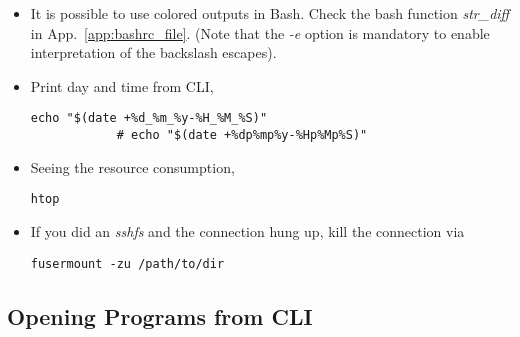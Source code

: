 \documentclass[12pt, a4paper]{article}
\numberwithin{equation}{section}
\theoremstyle{definition}
\theoremstyle{definition}
\begin{document}
\begin{itemize}
		\item It is possible to use colored outputs in Bash. Check the bash function \textit{str\_diff} in App.~\ref{app:bashrc_file}. (Note that the \textit{-e} option is mandatory to enable interpretation of the backslash escapes).
	
		\item Print day and time from CLI,
		
		\begin{lstlisting}[style=mystylebash, label=alg:cli_date, xleftmargin=\parindent]
			echo "$(date +%d_%m_%y-%H_%M_%S)"
			# echo "$(date +%dp%mp%y-%Hp%Mp%S)"
		\end{lstlisting}
	
		\item Seeing the resource consumption,
		\begin{lstlisting}[style=mystylebash, label=alg:htop, xleftmargin=\parindent]
			htop
		\end{lstlisting}
		
		\item If you did an \textit{sshfs} and the connection hung up, kill the connection via
		\begin{lstlisting}[style=mystylebash, label=alg:fusermount, xleftmargin=\parindent]
			fusermount -zu /path/to/dir
		\end{lstlisting}
		
	\end{itemize}
	
	\subsection{Opening Programs from CLI}
	
\end{document}
